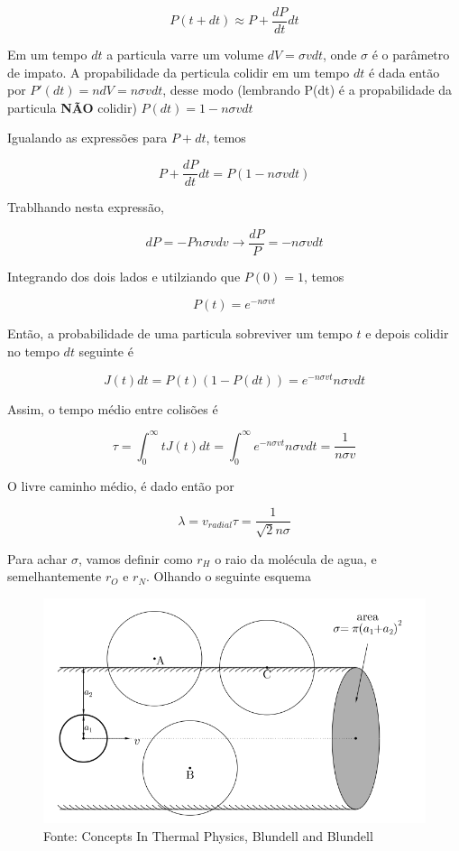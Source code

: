 \documentclass[11pt]{article}
\begin{document}
\begin{pproblem}
\begin{pssolution*}{}{}
\begin{alternativas}
    \[P(t+dt) \approx P + \frac{dP}{dt}dt\]

    Em um tempo \(dt\) a particula varre um volume \(dV = \sigma v dt\), onde \(\sigma\) é o parâmetro de impato. A propabilidade da perticula colidir em um tempo \(dt\) é dada então por \(P'(dt) = ndV = n\sigma v dt\), desse modo (lembrando P(dt) é a propabilidade da particula \textbf{NÃO} colidir) \(P(dt) = 1-n\sigma vdt\)

    Igualando as expressões para \(P+dt\), temos 

    \[P + \frac{dP}{dt}dt = P(1-n\sigma v dt)\]

    Trablhando nesta expressão, 

    \[dP = -Pn\sigma vdv \rightarrow \frac{dP}{P} = -n\sigma v dt\]

    Integrando dos dois lados e utilziando que \(P(0)=1\), temos 

    \[P(t) = e^{-n\sigma vt}\]

    Então, a probabilidade de uma particula sobreviver um tempo \(t\) e depois colidir no tempo \(dt\) seguinte é 

    \[J(t)dt = P(t)(1-P(dt)) = e^{-n\sigma v t} n\sigma v dt\]

    Assim, o tempo médio entre colisões é 

    \[\tau = \int_0^\infty t J(t)dt = \int_0^\infty e^{-n\sigma v t} n\sigma v dt = \frac{1}{n\sigma v}\]

    O livre caminho médio, é dado então por 

    \[\lambda = v_{radial}\tau = \frac{1}{\sqrt{2}n\sigma}\]

    Para achar \(\sigma\), vamos definir como \(r_H\) o raio da molécula de agua, e semelhantemente \(r_O\) e \(r_N\). Olhando o seguinte esquema 

    \begin{figure}[H]
        \centering
        \includegraphics[width= 0.7\linewidth]{imagens/secaotransversal.png}
        \caption{Fonte: Concepts In Thermal Physics, Blundell and Blundell}
    \end{figure}


\end{alternativas}
\end{pssolution*}
\end{pproblem}
\end{document}
